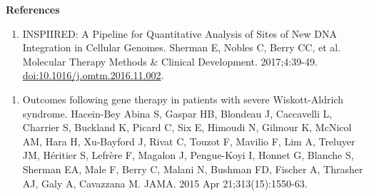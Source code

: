 \documentclass[12pt,]{article}
\providecommand{\tightlist}{%
  \setlength{\itemsep}{0pt}\setlength{\parskip}{0pt}}
\begin{document}
\endgroup{}

\newpage

\textbf{References}

\begin{enumerate}
\def\labelenumi{\arabic{enumi}.}
\tightlist
\item
  INSPIIRED: A Pipeline for Quantitative Analysis of Sites of New DNA
  Integration in Cellular Genomes. Sherman E, Nobles C, Berry CC, et al.
  Molecular Therapy Methods \& Clinical Development. 2017;4:39-49.
  \url{doi:10.1016/j.omtm.2016.11.002}.
\end{enumerate}

\vspace{0.10cm}

\begin{enumerate}
\def\labelenumi{\arabic{enumi}.}
\setcounter{enumi}{1}
\tightlist
\item
  Outcomes following gene therapy in patients with severe
  Wiskott-Aldrich syndrome. Hacein-Bey Abina S, Gaspar HB, Blondeau J,
  Caccavelli L, Charrier S, Buckland K, Picard C, Six E, Himoudi N,
  Gilmour K, McNicol AM, Hara H, Xu-Bayford J, Rivat C, Touzot F,
  Mavilio F, Lim A, Treluyer JM, Héritier S, Lefrère F, Magalon J,
  Pengue-Koyi I, Honnet G, Blanche S, Sherman EA, Male F, Berry C,
  Malani N, Bushman FD, Fischer A, Thrasher AJ, Galy A, Cavazzana M.
  JAMA. 2015 Apr 21;313(15):1550-63.
\end{enumerate}
\end{document}
